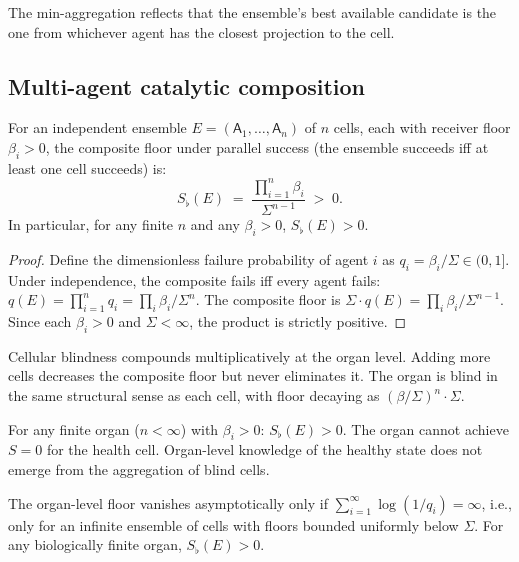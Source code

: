 \documentclass[twocolumn,11pt,a4paper]{article}
\newcommand{\Sfloor}{S_{\flat}}
\newcommand{\agent}{\mathsf{A}}
\begin{document}
\begin{remark}\label{rem:min-aggregate}
The min-aggregation reflects that the ensemble's best available candidate
is the one from whichever agent has the closest projection to the cell.
\end{remark}

\subsection{Multi-agent catalytic composition}

\begin{theorem}\label{thm:group-blindness}
For an independent ensemble $E = (\agent_1,\dots,\agent_n)$ of $n$ cells,
each with receiver floor $\beta_i > 0$, the composite floor under
parallel success (the ensemble succeeds iff at least one cell succeeds) is:
\[
\Sfloor(E) \;=\; \frac{\prod_{i=1}^n \beta_i}{\Sigma^{n-1}} \;>\; 0.
\]
In particular, for any finite $n$ and any $\beta_i > 0$,
$\Sfloor(E) > 0$.
\end{theorem}

\begin{proof}
Define the dimensionless failure probability of agent $i$ as
$q_i = \beta_i/\Sigma \in (0,1]$. Under independence, the composite
fails iff every agent fails:
$q(E) = \prod_{i=1}^n q_i = \prod_i \beta_i/\Sigma^n$.
The composite floor is $\Sigma \cdot q(E) = \prod_i \beta_i / \Sigma^{n-1}$.
Since each $\beta_i > 0$ and $\Sigma < \infty$, the product is strictly
positive.
\end{proof}

\begin{corollary}\label{cor:multiplicative}
Cellular blindness compounds multiplicatively at the organ level.
Adding more cells decreases the composite floor but never eliminates it.
The organ is blind in the same structural sense as each cell,
with floor decaying as $(\beta/\Sigma)^n \cdot \Sigma$.
\end{corollary}

\begin{corollary}\label{cor:no-emergence}
For any finite organ ($n < \infty$) with $\beta_i > 0$:
$\Sfloor(E) > 0$.
The organ cannot achieve $S = 0$ for the health cell. Organ-level
knowledge of the healthy state does not emerge from the
aggregation of blind cells.
\end{corollary}

\begin{theorem}\label{thm:asymp}
The organ-level floor vanishes asymptotically only if
$\sum_{i=1}^\infty \log(1/q_i) = \infty$, i.e., only for an
infinite ensemble of cells with floors bounded uniformly below
$\Sigma$. For any biologically finite organ, $\Sfloor(E) > 0$.
\end{theorem}
\end{document}
